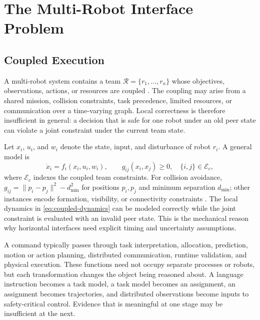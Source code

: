 \section{The Multi-Robot Interface Problem}
\label{sec:background}

\subsection{Coupled Execution}

A multi-robot system contains a team $\mathcal R=\{r_1,\ldots,r_n\}$ whose
objectives, observations, actions, or resources are coupled
\cite{gerkey2004mrta,street2023formal,gielis2022communications}.  The coupling
may arise from a shared mission, collision constraints, task precedence, limited
resources, or communication over a time-varying graph.  Local correctness is
therefore insufficient in general: a decision that is safe for one robot under
an old peer state can violate a joint constraint under the current team state.

Let $x_i$, $u_i$, and $w_i$ denote the state, input, and disturbance of robot
$r_i$.  A general model is
\begin{equation}
  \dot x_i=f_i(x_i,u_i,w_i),\qquad
  g_{ij}(x_i,x_j)\ge 0,\quad \{i,j\}\in\mathcal E_c,
  \label{eq:coupled-dynamics}
\end{equation}
where $\mathcal E_c$ indexes the coupled team constraints.  For collision
avoidance, $g_{ij}=\lVert p_i-p_j\rVert^2-d_{\min}^2$ for positions $p_i,p_j$
and minimum separation $d_{\min}$; other instances encode formation, visibility,
or connectivity constraints
\cite{sharf2021dynamical,chen2019invariance,wang2017barrier}.  The local
dynamics in \eqref{eq:coupled-dynamics} can be modeled correctly while the joint
constraint is evaluated with an invalid peer state.  This is the mechanical
reason why horizontal interfaces need explicit timing and uncertainty
assumptions.

A command typically passes through task interpretation, allocation, prediction,
motion or action planning, distributed communication, runtime validation, and
physical execution.  These functions need not occupy separate processes or
robots, but each transformation changes the object being reasoned about.  A
language instruction becomes a task model, a task model becomes an assignment,
an assignment becomes trajectories, and distributed observations become inputs
to safety-critical control.  Evidence that is meaningful at one stage may be
insufficient at the next.

